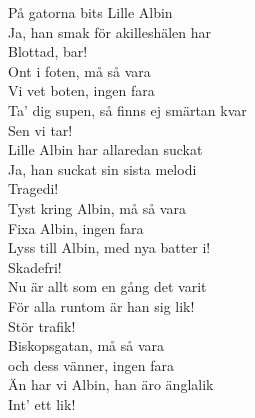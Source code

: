 \documentclass[12pt]{article}
\begin{document}
\begin{minipage}[0,475\textwidth]
\noindent
På gatorna bits Lille Albin\\
Ja, han smak för akilleshälen har\\
Blottad, bar!\\

\noindent
Ont i foten, må så vara\\
Vi vet boten, ingen fara\\
Ta' dig supen, så finns ej smärtan kvar\\
Sen vi tar!\\

\noindent
Lille Albin har allaredan suckat\\
Ja, han suckat sin sista melodi\\
Tragedi!\\

\noindent
Tyst kring Albin, må så vara\\
Fixa Albin, ingen fara\\
Lyss till Albin, med nya batter i!\\
Skadefri!\\

\noindent
Nu är allt som en gång det varit\\
För alla runtom är han sig lik!\\
Stör trafik!\\

\noindent
Biskopsgatan, må så vara\\
och dess vänner, ingen fara\\
Än har vi Albin, han äro änglalik\\
Int' ett lik!\\

\end{minipage}
\end{document}
